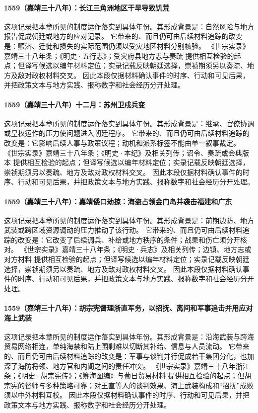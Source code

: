\paragraph{1559（嘉靖三十八年）：长江三角洲地区干旱导致饥荒} 这项记录把本章所见的制度运作落实到具体年份。其形成背景是：自然风险与地方报告促成朝廷或地方的应对记录。 它带来的、而且仍可由后续材料追踪的改变是：赈济、迁徙和损失的实际范围仍须以受灾地区材料分别核验。 《世宗实录》嘉靖三十八年条；《明史·五行志》；受灾府县地方志与奏疏 提供相互检验的起点；但译写候选以编年材料定位；实录记载反映朝廷选择，崇祯期须另以奏疏、地方及敌对政权材料交叉。 因此本段仅据材料确认事件的时序、行动和可见后果，并把政策文本与地方实践、报称数字和社会经历分开处理。

\paragraph{1559（嘉靖三十八年）十二月：苏州卫戍兵变} 这项记录把本章所见的制度运作落实到具体年份。其形成背景是：继承、官僚协调或皇权运作的压力使问题进入朝廷程序。 它带来的、而且仍可由后续材料追踪的改变是：它影响后续人事与政策议程；动机和派系标签不能由单一叙事裁定。 《世宗实录》嘉靖三十八年条；《明史·本纪》及相关列传；诏令、奏疏或会典版本 提供相互检验的起点；但译写候选以编年材料定位；实录记载反映朝廷选择，崇祯期须另以奏疏、地方及敌对政权材料交叉。 因此本段仅据材料确认事件的时序、行动和可见后果，并把政策文本与地方实践、报称数字和社会经历分开处理。

\paragraph{1559（嘉靖三十八年）：嘉靖倭口劫掠：海盗占领金门岛并袭击福建和广东} 这项记录把本章所见的制度运作落实到具体年份。其形成背景是：前期边防、地方武装或跨区域资源调动的压力推动了该行动。 它带来的、而且仍可由后续材料追踪的改变是：它改变了后续调兵、补给或地方秩序的条件；战果和伤亡须分开核对。 《世宗实录》嘉靖三十八年条；《明史·兵志》及相关列传；边镇、地方志或对方材料 提供相互检验的起点；但译写候选以编年材料定位；实录记载反映朝廷选择，崇祯期须另以奏疏、地方及敌对政权材料交叉。 因此本段仅据材料确认事件的时序、行动和可见后果，并把政策文本与地方实践、报称数字和社会经历分开处理。

\paragraph{1559（嘉靖三十八年）：胡宗宪督理浙直军务，以招抚、离间和军事追击并用应对海上武装} 这项记录把本章所见的制度运作落实到具体年份。其形成背景是：沿海武装与跨海贸易网络相连，单纯海禁和陆上围剿难以切断其补给、信息与人员流动。 它带来的、而且仍可由后续材料追踪的改变是：军事与谈判并行促成若干集团分化，也加深了海防将领、地方官和内阁之间的责任冲突。 《世宗实录》嘉靖三十八年浙江条；《明史·胡宗宪传》；《筹海图编》与葡日贸易材料 提供相互检验的起点；但胡宗宪的督师与多种策略可靠；对王直等人的谈判效果、海上武装构成和“招抚”成败须以中外材料互校。 因此本段仅据材料确认事件的时序、行动和可见后果，并把政策文本与地方实践、报称数字和社会经历分开处理。

